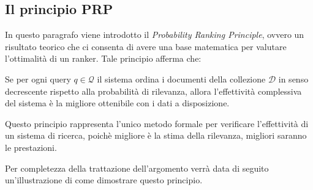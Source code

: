\subsection{Il principio PRP}

In questo paragrafo viene introdotto il \textit{Probability Ranking Principle}, ovvero un risultato
teorico che ci consenta di avere una base matematica per valutare l'ottimalità di un ranker.
Tale principio afferma che:

\begin{definizione}\label{def:prp}
	Se per ogni query $q \in \mathcal{Q}$ il sistema ordina i documenti della collezione $\mathcal{D}$ in
	senso decrescente rispetto alla probabilità di rilevanza, allora l'effettività complessiva del sistema
	è la migliore ottenibile con i dati a disposizione.
\end{definizione}

Questo principio rappresenta l'unico metodo formale per verificare l'effettività di un sistema
di ricerca, poichè migliore è la stima della rilevanza, migliori saranno le prestazioni.

Per completezza della trattazione dell'argomento verrà data di seguito
un'illustrazione di come dimostrare questo principio.

